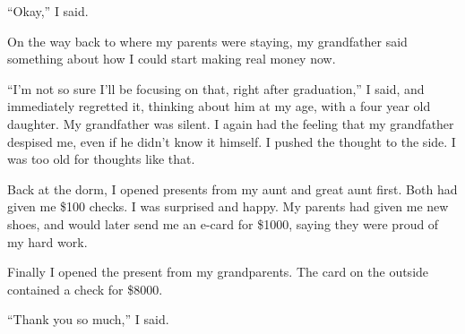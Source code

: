 ``Okay,'' I said.  

On the way back to where my parents were staying, my grandfather said something
about how I could start making real money now.

``I'm not so sure I'll be focusing on that, right after graduation,'' I said,
and immediately regretted it, thinking about him at my age, with a four year old
daughter.  My grandfather was silent.  I again had the feeling that my
grandfather despised me, even if he didn't know it himself.  I pushed the
thought to the side.  I was too old for thoughts like that.

Back at the dorm, I opened presents from my aunt and great aunt first.  Both had
given me \$100 checks.  I was surprised and happy.  My parents had given me new
shoes, and would later send me an e-card for \$1000, saying they were proud of
my hard work.  

Finally I opened the present from my grandparents.  The card on the outside
contained a check for \$8000.  

``Thank you so much,'' I said.
